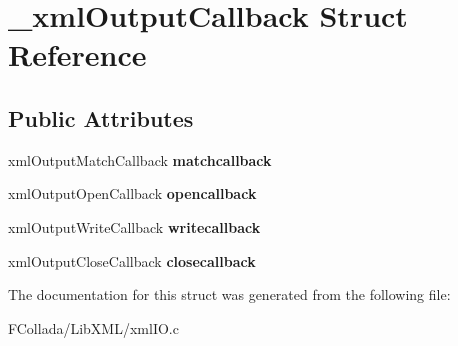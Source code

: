 \hypertarget{struct__xmlOutputCallback}{
\section{\_\-xmlOutputCallback Struct Reference}
\label{struct__xmlOutputCallback}
}
\subsection*{Public Attributes}
\begin{DoxyCompactItemize}
\item 
\hypertarget{struct__xmlOutputCallback_ac68252bb556ffbba5eef79f31bfc4943}{
xmlOutputMatchCallback {\bfseries matchcallback}}
\label{struct__xmlOutputCallback_ac68252bb556ffbba5eef79f31bfc4943}

\item 
\hypertarget{struct__xmlOutputCallback_a660e8feccca76f23e796cf7c9548597d}{
xmlOutputOpenCallback {\bfseries opencallback}}
\label{struct__xmlOutputCallback_a660e8feccca76f23e796cf7c9548597d}

\item 
\hypertarget{struct__xmlOutputCallback_a668cbd03ced54a721c4f58a6c4c8e05e}{
xmlOutputWriteCallback {\bfseries writecallback}}
\label{struct__xmlOutputCallback_a668cbd03ced54a721c4f58a6c4c8e05e}

\item 
\hypertarget{struct__xmlOutputCallback_aa05c867804bfa2961c3265d5f33753ae}{
xmlOutputCloseCallback {\bfseries closecallback}}
\label{struct__xmlOutputCallback_aa05c867804bfa2961c3265d5f33753ae}

\end{DoxyCompactItemize}


The documentation for this struct was generated from the following file:\begin{DoxyCompactItemize}
\item 
FCollada/LibXML/xmlIO.c\end{DoxyCompactItemize}
